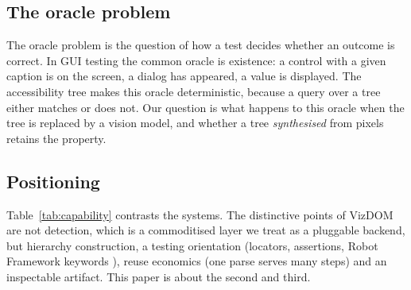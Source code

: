 \documentclass[conference]{IEEEtran}
\begin{document}
\subsection{The oracle problem}
The oracle problem \cite{barr2015oracle} is the question of how a test decides whether an outcome is correct. In GUI testing the common oracle is existence: a control with a given caption is on the screen, a dialog has appeared, a value is displayed. The accessibility tree makes this oracle deterministic, because a query over a tree either matches or does not. Our question is what happens to this oracle when the tree is replaced by a vision model, and whether a tree \emph{synthesised} from pixels retains the property.

\subsection{Positioning}
Table~\ref{tab:capability} contrasts the systems. The distinctive points of VizDOM are not detection, which is a commoditised layer we treat as a pluggable backend, but hierarchy construction, a testing orientation (locators, assertions, Robot Framework keywords \cite{robotframework}), reuse economics (one parse serves many steps) and an inspectable artifact. This paper is about the second and third.

\begin{table}[t]
  \centering\scriptsize\setlength{\tabcolsep}{3pt}
  \caption{Capability matrix. ``pt'' = a single point; ``flat'' = a flat list; ``re-inf.'' = re-infers per step.}
  \label{tab:capability}
\end{table}
\end{document}
